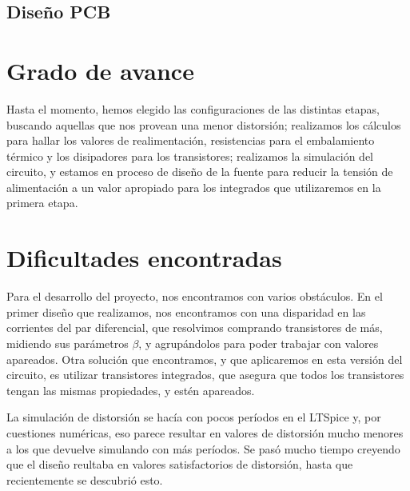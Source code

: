 \documentclass[a4paper,12pt,twoside]{article}
\begin{document}










\subsection{Diseño PCB}


\section{Grado de avance}

Hasta el momento, hemos elegido las configuraciones de las distintas etapas, buscando aquellas que nos provean una menor distorsión; realizamos los cálculos para hallar los valores de realimentación, resistencias para el embalamiento térmico y los disipadores para los transistores; realizamos la simulación del circuito, y estamos en proceso de diseño de la fuente para reducir la tensión de alimentación a un valor apropiado para los integrados que utilizaremos en la primera etapa. 

\section{Dificultades encontradas}

Para el desarrollo del proyecto, nos encontramos con varios obstáculos. En el primer diseño que realizamos, nos encontramos con una disparidad en las corrientes del par diferencial, que resolvimos comprando transistores de más, midiendo sus parámetros $\beta$, y agrupándolos para poder trabajar con valores apareados. Otra solución que encontramos, y que aplicaremos en esta versión del circuito, es utilizar transistores integrados, que asegura que todos los transistores tengan las mismas propiedades, y estén apareados.

La simulación de distorsión se hacía con pocos períodos en el LTSpice y, por cuestiones numéricas, eso parece resultar en valores de distorsión mucho menores a los que devuelve simulando con más períodos. Se pasó mucho tiempo creyendo que el diseño reultaba en valores satisfactorios de distorsión, hasta que recientemente se descubrió esto.
\end{document}
